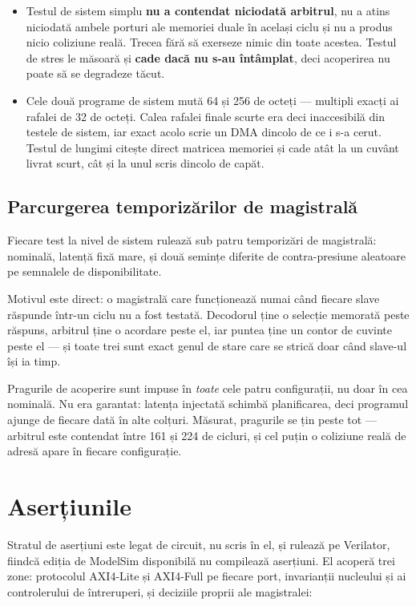 \documentclass[11pt,openany]{report}
\begin{document}
\begin{itemize}[itemsep=4pt,topsep=3pt]
\item Testul de sistem simplu \textbf{nu a contendat niciodată arbitrul}, nu a
      atins niciodată ambele porturi ale memoriei duale în același ciclu și nu a
      produs nicio coliziune reală. Trecea fără să exerseze nimic din toate
      acestea. Testul de stres le măsoară și \textbf{cade dacă nu s-au
      întâmplat}, deci acoperirea nu poate să se degradeze tăcut.
\item Cele două programe de sistem mută 64 și 256 de octeți --- multipli exacți
      ai rafalei de 32 de octeți. Calea rafalei finale scurte era deci
      inaccesibilă din testele de sistem, iar exact acolo scrie un DMA dincolo de
      ce i s-a cerut. Testul de lungimi citește direct matricea memoriei și cade
      atât la un cuvânt livrat scurt, cât și la unul scris dincolo de capăt.
\end{itemize}

\subsection{Parcurgerea temporizărilor de magistrală}
\label{sec:sweep}

Fiecare test la nivel de sistem rulează sub patru temporizări de magistrală:
nominală, latență fixă mare, și două semințe diferite de contra-presiune
aleatoare pe semnalele de disponibilitate.

Motivul este direct: o magistrală care funcționează numai când fiecare slave
răspunde într-un ciclu nu a fost testată. Decodorul ține o selecție memorată
peste răspuns, arbitrul ține o acordare peste el, iar puntea ține un contor de
cuvinte peste el --- și toate trei sunt exact genul de stare care se strică doar
când slave-ul își ia timp.

Pragurile de acoperire sunt impuse în \emph{toate} cele patru configurații, nu
doar în cea nominală. Nu era garantat: latența injectată schimbă planificarea,
deci programul ajunge de fiecare dată în alte colțuri. Măsurat, pragurile se
țin peste tot --- arbitrul este contendat între 161 și 224 de cicluri, și cel
puțin o coliziune reală de adresă apare în fiecare configurație.

\section{Aserțiunile}
\label{sec:sva}

Stratul de aserțiuni este legat de circuit, nu scris în el, și rulează pe
Verilator, fiindcă ediția de ModelSim disponibilă nu compilează aserțiuni. El
acoperă trei zone: protocolul AXI4-Lite și AXI4-Full pe fiecare port,
invarianții nucleului și ai controlerului de întreruperi, și deciziile proprii
ale magistralei:
\end{document}
